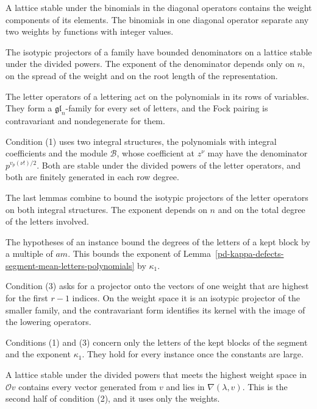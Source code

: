 A lattice stable under the binomials in the diagonal operators contains the weight components of its
elements. The binomials in one diagonal operator separate any two weights by functions with integer values.

The isotypic projectors of a family have bounded denominators on a lattice stable under the divided
powers. The exponent of the denominator depends only on $n$, on the spread of the weight and on the root
length of the representation.

The letter operators of a lettering act on the polynomials in its rows of variables. They form a
$\mathfrak{gl}_n$-family for every set of letters, and the Fock pairing is contravariant and nondegenerate
for them.

Condition (1) uses two integral structures, the polynomials with integral coefficients and the module
$\mathcal B$, whose coefficient at $z^\nu$ may have the denominator $p^{v_p(\nu!)/2}$. Both are stable under
the divided powers of the letter operators, and both are finitely generated in each row degree.

The last lemmas combine to bound the isotypic projectors of the letter operators on both integral
structures. The exponent depends on $n$ and on the total degree of the letters involved.

The hypotheses of an instance bound the degrees of the letters of a kept block by a multiple of $am$. This
bounds the exponent of Lemma~\ref{pd-kappa-defects-segment-mean-letters-polynomials} by $\kappa_1$.

Condition (3) asks for a projector onto the vectors of one weight that are highest for the first $r-1$
indices. On the weight space it is an isotypic projector of the smaller family, and the contravariant
form identifies its kernel with the image of the lowering operators.

Conditions (1) and (3) concern only the letters of the kept blocks of the segment and the exponent
$\kappa_1$. They hold for every instance once the constants are large.

A lattice stable under the divided powers that meets the highest weight space in $\mathcal Ov$ contains
every vector generated from $v$ and lies in $\nabla(\lambda,v)$. This is the second half of condition (2),
and it uses only the weights.

